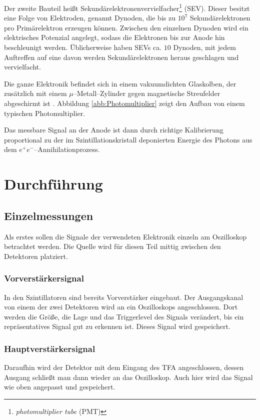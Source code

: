 \documentclass[12pt,a4paper]{scrartcl}
\numberwithin{equation}{section} %
\begin{document}
Der zweite Bauteil heißt Sekundärelektronenvervielfacher\footnote{\emph{photomultiplier tube} (PMT)} (SEV). Dieser besitzt eine Folge von Elektroden, genannt Dynoden, die bis zu $10^7$ Sekundärelektronen pro Primärelektron erzeugen können. Zwischen den einzelnen Dynoden wird ein elektrisches Potenzial angelegt, sodass die Elektronen bis zur Anode hin beschleunigt werden. Üblicherweise haben SEVs ca. $10$ Dynoden, mit jedem Auftreffen auf eine davon werden Sekundärelektronen heraus geschlagen und vervielfacht.

Die ganze Elektronik befindet sich in einem vakuumdichten Glaskolben, der zusätzlich mit einem $\mu$--Metall--Zylinder gegen magnetische Streufelder abgeschirmt ist \cite{LMU}. Abbildung \ref{abb:Photomultiplier} zeigt den Aufbau von einem typischen Photomultiplier.

Das messbare Signal an der Anode ist dann durch richtige Kalibrierung proportional zu der im Szintillationskristall deponierten Energie des Photons aus dem $e^+ e^-$--Annihilationprozess.

\clearpage
\hypertarget{durchfuxfchrung}{%
\section{Durchführung}\label{durchfuxfchrung}}

\subsection{Einzelmessungen}
Als erstes sollen die Signale der verwendeten Elektronik einzeln am Oszilloskop betrachtet werden. Die Quelle wird für diesen Teil mittig zwischen den Detektoren platziert.

\subsubsection{Vorverstärkersignal}
In den Szintillatoren sind bereits Vorverstärker eingebaut. Der Ausgangskanal von einem der zwei Detektoren wird an ein Oszilloskops angeschlossen. Dort werden die Größe, die Lage und das Triggerlevel des Signals verändert, bis ein repräsentatives Signal gut zu erkennen ist. Dieses Signal wird gespeichert.

\subsubsection{Hauptverstärkersignal}
Daraufhin wird der Detektor mit dem Eingang des TFA angeschlossen, dessen Ausgang schließt man dann wieder an das Oszilloskop. Auch hier wird das Signal wie oben angepasst und gespeichert.
\end{document}

